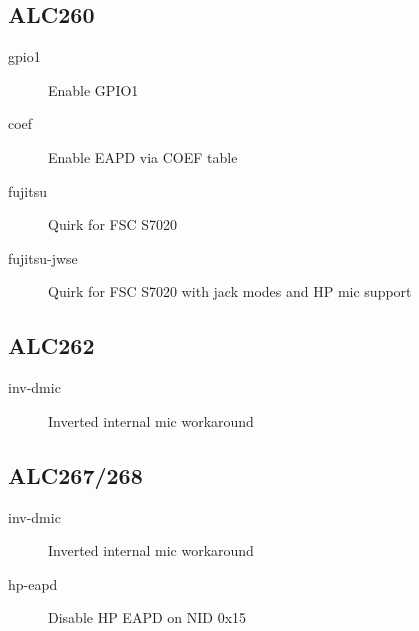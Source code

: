 \documentclass[a4paper,8pt,english]{sphinxmanual}
\begin{document}
\subsection{ALC260}
\label{sound/hd-audio/models:alc260}\begin{description}
\item[{gpio1}] \leavevmode
Enable GPIO1

\item[{coef}] \leavevmode
Enable EAPD via COEF table

\item[{fujitsu}] \leavevmode
Quirk for FSC S7020

\item[{fujitsu-jwse}] \leavevmode
Quirk for FSC S7020 with jack modes and HP mic support

\end{description}


\subsection{ALC262}
\label{sound/hd-audio/models:alc262}\begin{description}
\item[{inv-dmic}] \leavevmode
Inverted internal mic workaround

\end{description}


\subsection{ALC267/268}
\label{sound/hd-audio/models:alc267-268}\begin{description}
\item[{inv-dmic}] \leavevmode
Inverted internal mic workaround

\item[{hp-eapd}] \leavevmode
Disable HP EAPD on NID 0x15

\end{description}
\end{document}
